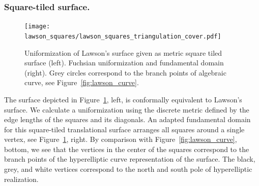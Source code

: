 \documentclass[Thesis]{subfiles}
\begin{document}
\subsubsection{Square-tiled surface.}

\begin{figure}
	\centering
	\resizebox{!}{6cm} {
	\texttt{[image: lawson\_squares/lawson\_squares\_triangulation\_cover.pdf]}
	}
	\caption{Uniformization of Lawson's surface given as metric square tiled surface (left). Fuchsian
uniformization and fundamental domain (right). Grey circles correspond to the branch points of algebraic curve, see Figure~\ref{fig:lawson_curve}.}
\label{fig:lawson_squares}
\end{figure}

The surface depicted in Figure~\ref{fig:lawson_squares}, left, is conformally equivalent to Lawson's surface. We calculate a uniformization using the discrete metric defined by the edge lengths of the squares and its diagonals. An adapted fundamental domain for this square-tiled translational surface arranges all squares around a single vertex, see Figure~\ref{fig:lawson_squares}, right. By comparison with Figure~\ref{fig:lawson_curve}, bottom, we see that the vertices in the center of the squares correspond to the branch points of the hyperelliptic curve representation of the surface. The black, grey, and white vertices correspond to the north and south pole of hyperelliptic realization.

\subfilebibliography

%
%
%
%
\end{document}
